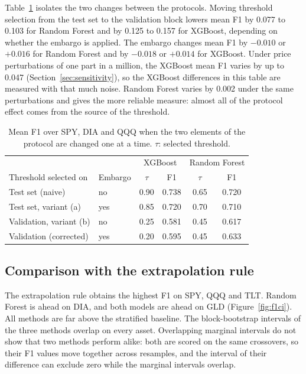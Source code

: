 \documentclass[11pt,a4paper]{article}
\begin{document}
Table~\ref{tab:decomp} isolates the two changes between the protocols. Moving threshold selection
from the test set to the validation block lowers mean F1 by 0.077 to 0.103 for Random Forest and
by 0.125 to 0.157 for XGBoost, depending on whether the embargo is applied. The embargo changes
mean F1 by $-0.010$ or $+0.016$ for Random Forest and by $-0.018$ or $+0.014$ for XGBoost.
Under price perturbations of one part in a million, the XGBoost mean F1 varies by up to 0.047
(Section~\ref{sec:sensitivity}), so the XGBoost differences in this table are measured with
that much noise. Random Forest varies by 0.002 under the same perturbations and gives the more
reliable measure: almost all of the protocol effect comes from the source of the threshold.

\begin{table}[h]
\centering
\begin{tabular}{llcccc}
\toprule
 & & \multicolumn{2}{c}{XGBoost} & \multicolumn{2}{c}{Random Forest} \\
Threshold selected on & Embargo & $\tau$ & F1 & $\tau$ & F1 \\
\midrule
Test set (naive) & no & 0.90 & 0.738 & 0.65 & 0.720 \\
Test set, variant (a) & yes & 0.85 & 0.720 & 0.70 & 0.710 \\
Validation, variant (b) & no & 0.25 & 0.581 & 0.45 & 0.617 \\
Validation (corrected) & yes & 0.20 & 0.595 & 0.45 & 0.633 \\
\bottomrule
\end{tabular}
\caption{Mean F1 over SPY, DIA and QQQ when the two elements of the protocol are changed one at a
time. $\tau$: selected threshold.}
\label{tab:decomp}
\end{table}

\subsection{Comparison with the extrapolation rule}

The extrapolation rule obtains the highest F1 on SPY, QQQ and TLT. Random Forest is ahead on DIA,
and both models are ahead on GLD (Figure~\ref{fig:f1ci}). All methods are far above the stratified
baseline. The block-bootstrap intervals of the three methods overlap on every asset. Overlapping
marginal intervals do not show that two methods perform alike: both are scored on the same
crossovers, so their F1 values move together across resamples, and the interval of their
difference can exclude zero while the marginal intervals overlap.
\end{document}
